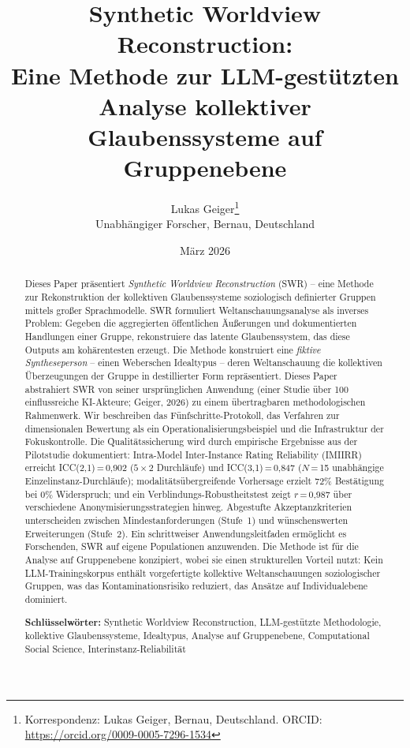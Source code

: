 \documentclass[11pt,a4paper]{article}
\title{%
  \sffamily\bfseries
  Synthetic Worldview Reconstruction:\\[0.3em]
  \large Eine Methode zur LLM-gest\"utzten\\
  Analyse kollektiver Glaubenssysteme auf Gruppenebene%
}
\author{%
  Lukas Geiger\thanks{Korrespondenz: Lukas Geiger, Bernau, Deutschland. ORCID: \url{https://orcid.org/0009-0005-7296-1534}}\\[0.3em]
  \small Unabh\"angiger Forscher, Bernau, Deutschland
}
\date{M\"arz 2026}
\begin{document}
\maketitle
\thispagestyle{empty}

\begin{abstract}
\noindent
Dieses Paper pr\"asentiert \emph{Synthetic Worldview Reconstruction} (SWR) -- eine Methode zur Rekonstruktion der kollektiven Glaubenssysteme soziologisch definierter Gruppen mittels gro\ss{}er Sprachmodelle. SWR formuliert Weltanschauungsanalyse als inverses Problem: Gegeben die aggregierten \"offentlichen \"Au\ss{}erungen und dokumentierten Handlungen einer Gruppe, rekonstruiere das latente Glaubenssystem, das diese Outputs am koh\"arentesten erzeugt. Die Methode konstruiert eine \emph{fiktive Syntheseperson} -- einen Weberschen Idealtypus -- deren Weltanschauung die kollektiven \"Uberzeugungen der Gruppe in destillierter Form repr\"asentiert. Dieses Paper abstrahiert SWR von seiner urspr\"unglichen Anwendung (einer Studie \"uber 100 einflussreiche KI-Akteure; Geiger, 2026) zu einem \"ubertragbaren methodologischen Rahmenwerk. Wir beschreiben das F\"unfschritte-Protokoll, das Verfahren zur dimensionalen Bewertung als ein Operationalisierungsbeispiel und die Infrastruktur der Fokuskontrolle. Die Qualit\"atssicherung wird durch empirische Ergebnisse aus der Pilotstudie dokumentiert: Intra-Model Inter-Instance Rating Reliability (IMIIRR) erreicht ICC(2,1)\,=\,0,902 ($5 \times 2$ Durchl\"aufe) und ICC(3,1)\,=\,0,847 ($N$\,=\,15 unabh\"angige Einzelinstanz-Durchl\"aufe); modalit\"ats\"ubergreifende Vorhersage erzielt 72\% Best\"atigung bei 0\% Widerspruch; und ein Verblindungs-Robustheitstest zeigt $r$\,=\,0,987 \"uber verschiedene Anonymisierungsstrategien hinweg. Abgestufte Akzeptanzkriterien unterscheiden zwischen Mindestanforderungen (Stufe~1) und w\"unschenswerten Erweiterungen (Stufe~2). Ein schrittweiser Anwendungsleitfaden erm\"oglicht es Forschenden, SWR auf eigene Populationen anzuwenden. Die Methode ist f\"ur die Analyse auf Gruppenebene konzipiert, wobei sie einen strukturellen Vorteil nutzt: Kein LLM-Trainingskorpus enth\"alt vorgefertigte kollektive Weltanschauungen soziologischer Gruppen, was das Kontaminationsrisiko reduziert, das Ans\"atze auf Individualebene dominiert.

\medskip
\noindent\textbf{Schl\"usselw\"orter:} Synthetic Worldview Reconstruction, LLM-gest\"utzte Methodologie, kollektive Glaubenssysteme, Idealtypus, Analyse auf Gruppenebene, Computational Social Science, Interinstanz-Reliabilit\"at
\end{abstract}
\end{document}
